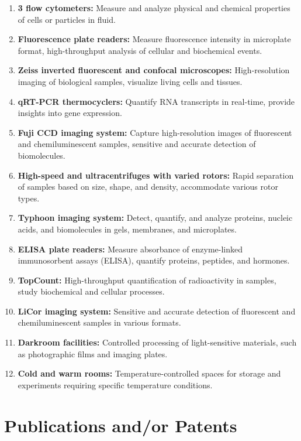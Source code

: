 \documentclass[onecolumn, compsoc,12pt]{IEEEtran}
\begin{document}
\begin{enumerate}
\item \textbf{3 flow cytometers:} Measure and analyze physical and chemical properties of cells or particles in fluid.
\item \textbf{Fluorescence plate readers:} Measure fluorescence intensity in microplate format, high-throughput analysis of cellular and biochemical events.
\item \textbf{Zeiss inverted fluorescent and confocal microscopes:} High-resolution imaging of biological samples, visualize living cells and tissues.
\item \textbf{qRT-PCR thermocyclers:} Quantify RNA transcripts in real-time, provide insights into gene expression.
\item \textbf{Fuji CCD imaging system:} Capture high-resolution images of fluorescent and chemiluminescent samples, sensitive and accurate detection of biomolecules.
\item \textbf{High-speed and ultracentrifuges with varied rotors:} Rapid separation of samples based on size, shape, and density, accommodate various rotor types.
\item \textbf{Typhoon imaging system:} Detect, quantify, and analyze proteins, nucleic acids, and biomolecules in gels, membranes, and microplates.
\item \textbf{ELISA plate readers:} Measure absorbance of enzyme-linked immunosorbent assays (ELISA), quantify proteins, peptides, and hormones.
\item \textbf{TopCount:} High-throughput quantification of radioactivity in samples, study biochemical and cellular processes.
\item \textbf{LiCor imaging system:} Sensitive and accurate detection of fluorescent and chemiluminescent samples in various formats.
\item \textbf{Darkroom facilities:} Controlled processing of light-sensitive materials, such as photographic films and imaging plates.
\item \textbf{Cold and warm rooms:} Temperature-controlled spaces for storage and experiments requiring specific temperature conditions.
\end{enumerate}


\clearpage

\section*{Publications and/or Patents}
\end{document}
